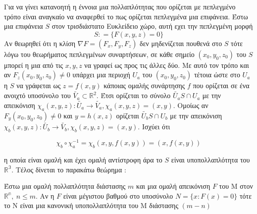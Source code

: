 Για να γίνει κατανοητή η έννοια μια πολλαπλότητας που ορίζεται με πεπλεγμένο τρόπο είναι αναγκαίο να αναφερθεί το πως ορίζεται πεπλεγμένα μια επιφάνεια. Έστω μια επιφάνεια $S$ στον τρισδιάστατο Ευκλείδειο χώρο, αυτή εχει την πεπλεγμένη μορφή 
\[S : =\{ F(x,y,z) =0 \} \]
Αν θεωρηθεί ότι η κλίση $ \nabla F= (F_x , F_y , F_z) $ δεν μηδενίζεται πουθενά στο $S$ τότε λόγω του θεωρήματος πεπλεγμένων συναρτήσεων, σε κάθε σημείο $(x_0 , y_0, z_0) $ του $S$ μπορεί η μια από τις $x, y, z $ να γραφεί ως προς τις άλλες δύο. Με αυτό τον τρόπο και αν $F_z(x_0 , y_0, z_0) \neq 0 $ υπάρχει μια περιοχή $U_a $ του $(x_0 , y_0, z_0)$ τέτοια ώστε στο $U_a $ η $S$  να γράφεται ως $z= f(x,y)$ κάποιας ομαλής συνάρτησης $f$ που ορίζεται σε ένα ανοιχτό υποσύνολο του $\tilde{V_a} \subset \mathbb{R}^2$. Έτσι ορίζεται το σύνολο $\tilde{U_a} S\cap U_a $   με την απεικόνιση $\chi_a (x,y,z) : \tilde{U_a} \rightarrow \tilde{V_a}, \chi_a (x,y,z) =(x,y)  $. Ομοίως αν $F_y(x_0 , y_0, z_0) \neq 0 $ και $y= h(x,z)$ ορίζεται  $\tilde{U_b} S\cap U_b $   με την απεικόνιση $\chi_b (x,y,z) : \tilde{U_b} \rightarrow \tilde{V_b}, \chi_b (x,y,z) =(x,y)  $. Ισχύει ότι 

\[  \chi_b \circ \chi_a ^{-1} =  \chi_b (x,y ,f(x,y)) = (x,f(x,y)) \]

η οποία είναι ομαλή και έχει ομαλή αντίστροφη άρα το $S$ είναι υποπολλαπλότητα του $\mathbb{R^3} $. Τέλος δίνεται το παρακάτω θεώρημα : 
\begin{theorem}
Έστω μια ομαλή πολλαπλότητα διάστασης $m$ και μια ομαλή απεικόνιση $F$ του Μ στον $\mathbb{R^n}, ~ n\leq m$. Αν η $F$ είναι μέγιστου βαθμού  στο υποσύνολο $N=\{ x: F(x)=0 \} $ τότε το Ν είναι μια κανονική υποπολλαπλότητα του Μ  διάστασης $(m-n)$ 
\end{theorem}

\newpage

 